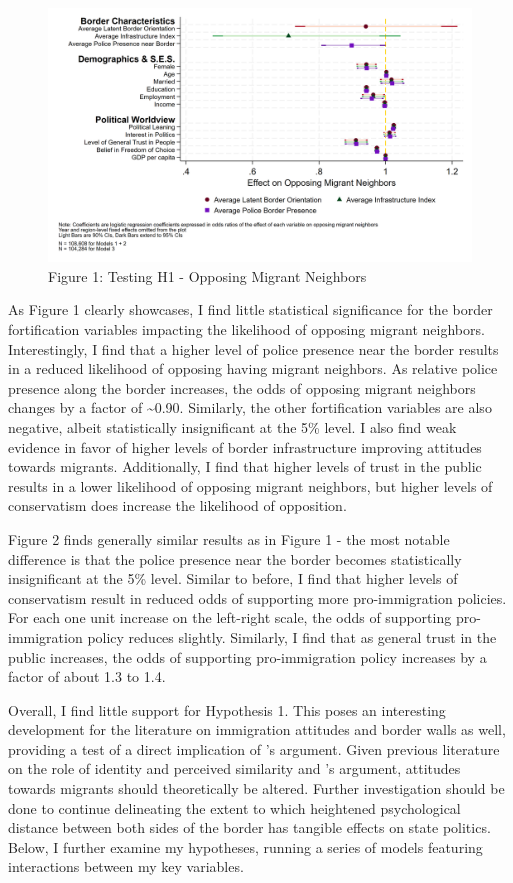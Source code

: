 \documentclass[12pt,]{article}
\begin{document}
\begin{figure}
\centering
\includegraphics{figures/border_orientation_figure1.png}
\caption{Figure 1: Testing H1 - Opposing Migrant Neighbors}
\end{figure}

As Figure 1 clearly showcases, I find little statistical significance
for the border fortification variables impacting the likelihood of
opposing migrant neighbors. Interestingly, I find that a higher level of
police presence near the border results in a reduced likelihood of
opposing having migrant neighbors. As relative police presence along the
border increases, the odds of opposing migrant neighbors changes by a
factor of \textasciitilde0.90. Similarly, the other fortification
variables are also negative, albeit statistically insignificant at the
5\% level. I also find weak evidence in favor of higher levels of border
infrastructure improving attitudes towards migrants. Additionally, I
find that higher levels of trust in the public results in a lower
likelihood of opposing migrant neighbors, but higher levels of
conservatism does increase the likelihood of opposition.

Figure 2 finds generally similar results as in Figure 1 - the most
notable difference is that the police presence near the border becomes
statistically insignificant at the 5\% level. Similar to before, I find
that higher levels of conservatism result in reduced odds of supporting
more pro-immigration policies. For each one unit increase on the
left-right scale, the odds of supporting pro-immigration policy reduces
slightly. Similarly, I find that as general trust in the public
increases, the odds of supporting pro-immigration policy increases by a
factor of about 1.3 to 1.4.

Overall, I find little support for Hypothesis 1. This poses an
interesting development for the literature on immigration attitudes and
border walls as well, providing a test of a direct implication of
\citet{mutz2022}'s argument. Given previous literature on the role of
identity and perceived similarity and \citet{mutz2022}'s argument,
attitudes towards migrants should theoretically be altered. Further
investigation should be done to continue delineating the extent to which
heightened psychological distance between both sides of the border has
tangible effects on state politics. Below, I further examine my
hypotheses, running a series of models featuring interactions between my
key variables.
\end{document}
